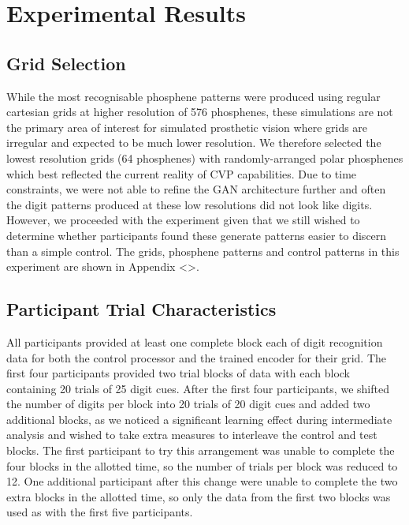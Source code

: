 \documentclass[a4paper,11pt,openany]{book}
\begin{document}
\chapter{Experimental Results}
\label{sec:org6986c62}

\section*{Grid Selection}
\label{sec:orgbe17f33}

While the most recognisable phosphene patterns were produced using regular cartesian grids at higher resolution of 576 phosphenes, these simulations are not the primary area of interest for simulated prosthetic vision where grids are irregular and expected to be much lower resolution.
We therefore selected the lowest resolution grids (64 phosphenes) with randomly-arranged polar phosphenes which best reflected the current reality of CVP capabilities.
Due to time constraints, we were not able to refine the GAN architecture further and often the digit patterns produced at these low resolutions did not look like digits.
However, we proceeded with the experiment given that we still wished to determine whether participants found these generate patterns easier to discern than a simple control.
The grids, phosphene patterns and control patterns in this experiment are shown in Appendix <>.

\section*{Participant Trial Characteristics}
\label{sec:org9f38ed9}

All participants provided at least one complete block each of digit recognition data for both the control processor and the trained encoder for their grid.
The first four participants provided two trial blocks of data with each block containing 20 trials of 25 digit cues.
After the first four participants, we shifted the number of digits per block into 20 trials of 20 digit cues and added two additional blocks, as we noticed a significant learning effect during intermediate analysis and wished to take extra measures to interleave the control and test blocks.
The first participant to try this arrangement was unable to complete the four blocks in the allotted time, so the number of trials per block was reduced to 12.
One additional participant after this change were unable to complete the two extra blocks in the allotted time, so only the data from the first two blocks was used as with the first five participants.
\end{document}
